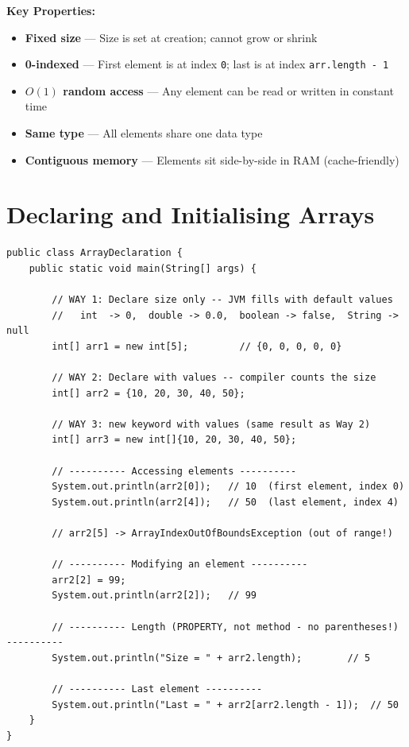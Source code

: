 \documentclass[12pt,a4paper,oneside]{book}
\begin{document}
\textbf{Key Properties:}
\begin{itemize}
  \item \textbf{Fixed size} --- Size is set at creation; cannot grow or shrink
  \item \textbf{0-indexed} --- First element is at index \texttt{0}; last is at index \texttt{arr.length - 1}
  \item \textbf{$O(1)$ random access} --- Any element can be read or written in constant time
  \item \textbf{Same type} --- All elements share one data type
  \item \textbf{Contiguous memory} --- Elements sit side-by-side in RAM (cache-friendly)
\end{itemize}

\section{Declaring and Initialising Arrays}

\begin{lstlisting}[caption={All ways to declare and initialise arrays in Java}]
public class ArrayDeclaration {
    public static void main(String[] args) {

        // WAY 1: Declare size only -- JVM fills with default values
        //   int  -> 0,  double -> 0.0,  boolean -> false,  String -> null
        int[] arr1 = new int[5];         // {0, 0, 0, 0, 0}

        // WAY 2: Declare with values -- compiler counts the size
        int[] arr2 = {10, 20, 30, 40, 50};

        // WAY 3: new keyword with values (same result as Way 2)
        int[] arr3 = new int[]{10, 20, 30, 40, 50};

        // ---------- Accessing elements ----------
        System.out.println(arr2[0]);   // 10  (first element, index 0)
        System.out.println(arr2[4]);   // 50  (last element, index 4)

        // arr2[5] -> ArrayIndexOutOfBoundsException (out of range!)

        // ---------- Modifying an element ----------
        arr2[2] = 99;
        System.out.println(arr2[2]);   // 99

        // ---------- Length (PROPERTY, not method - no parentheses!) ----------
        System.out.println("Size = " + arr2.length);        // 5

        // ---------- Last element ----------
        System.out.println("Last = " + arr2[arr2.length - 1]);  // 50
    }
}
\end{lstlisting}
\end{document}
